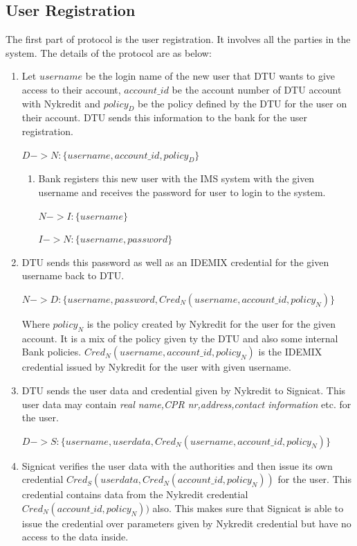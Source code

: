 \subsection{User Registration}
The first part of protocol is the user registration. It involves all the parties in the system. The details of the protocol are as below:
\begin{enumerate} 
\item 	Let  $username$ be the login name of the new user that DTU wants to give access to their account, $account\_id$ be the account number of DTU account with Nykredit and $policy_D$ be the policy defined by the DTU for the user on their account. DTU sends this information to the bank for the user registration.

\begin{center}
	$D -> N : \{username,account\_id,policy_D\}$
\end{center}
\begin{enumerate}
	\item Bank registers this new user with the IMS system with the given username and receives the password for user to login to the system.
	\begin{center}
		$N -> I : \{username\}$
		
		$I -> N : \{username,password\}$
		
	\end{center}	
\end{enumerate}
\item DTU sends this password as well as an IDEMIX credential for the given username back to DTU.
	\begin{center}
		$N -> D : \{username,password,Cred_N(username,account\_id,policy_N)\}$
	\end{center}	
Where $policy_N$ is the policy created by Nykredit for the user for the given account. It is a mix of the policy given ty the DTU and also some internal Bank policies. $Cred_N(username,account\_id,policy_N)$ is the IDEMIX credential issued by Nykredit for the user with given username.
\item DTU sends the user data and credential given by Nykredit to Signicat. This user data may contain \textit{real name,CPR nr,address,contact information} etc. for the user. 
\begin{center}
	$D -> S : \{username,userdata,Cred_N(username,account\_id,policy_N)\}$
\end{center}
\item Signicat verifies the user data with the authorities and then issue its own credential $Cred_S(userdata,Cred_N(account\_id,policy_N))$ for the user. This credential contains data from the Nykredit credential $Cred_N(account\_id,policy_N))$ also. This makes sure that Signicat is able to issue the credential over parameters given by Nykredit credential but have no access to the data inside.


\end{enumerate}
